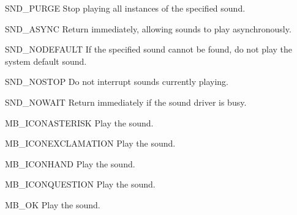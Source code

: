\begin{datadesc}{SND_PURGE}
  Stop playing all instances of the specified sound.
\end{datadesc}

\begin{datadesc}{SND_ASYNC}
  Return immediately, allowing sounds to play asynchronously.
\end{datadesc}

\begin{datadesc}{SND_NODEFAULT}
  If the specified sound cannot be found, do not play the system default
  sound.
\end{datadesc}

\begin{datadesc}{SND_NOSTOP}
  Do not interrupt sounds currently playing.
\end{datadesc}

\begin{datadesc}{SND_NOWAIT}
  Return immediately if the sound driver is busy.
\end{datadesc}

\begin{datadesc}{MB_ICONASTERISK}
  Play the  sound.
\end{datadesc}

\begin{datadesc}{MB_ICONEXCLAMATION}
  Play the  sound.
\end{datadesc}

\begin{datadesc}{MB_ICONHAND}
  Play the  sound.
\end{datadesc}

\begin{datadesc}{MB_ICONQUESTION}
  Play the  sound.
\end{datadesc}

\begin{datadesc}{MB_OK}
  Play the  sound.
\end{datadesc}

